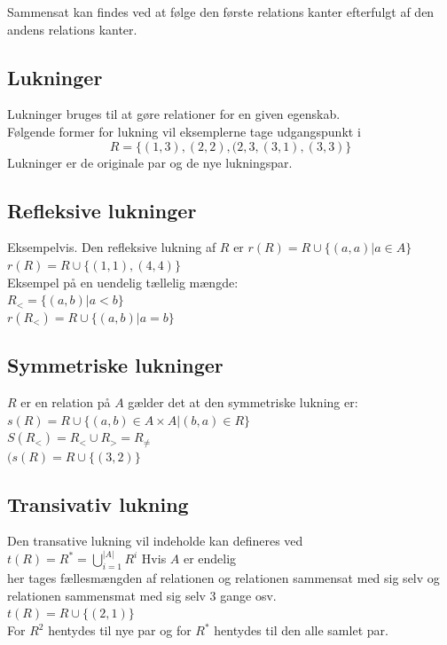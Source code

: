 \documentclass[12pt, a4paper]{article}
\begin{document}
				\begin{center}
					Sammensat kan findes ved at følge den første relations kanter efterfulgt af den andens relations kanter.
				\end{center}
			\subsection{Lukninger }
				Lukninger bruges til at gøre relationer for en given egenskab.\\
				Følgende former for lukning vil eksemplerne tage udgangspunkt i $$R=\{(1,3),(2,2),(2,3,(3,1),(3,3)\}$$
				Lukninger er de originale par og de nye lukningspar.\\
				\subsection{Refleksive lukninger}
					Eksempelvis. Den refleksive lukning af $R$ er $r(R)=R\cup \{(a,a)|a\in A\}$\\
					$r(R)=R\cup \{(1,1),(4,4)\}$\\
					Eksempel på en uendelig tællelig mængde:\\
					$R_<=\{(a,b)|a<b\}$\\
					$r(R_<)=R\cup \{(a,b)|a=b\}$
				\subsection{Symmetriske lukninger}
					$R$ er en relation på $A$ gælder det at den symmetriske lukning er:\\
					$s(R)=R\cup\{(a,b)\in A\times A|(b,a)\in R\}$\\
					$S(R_<)=R_< \cup R_> = R_{\neq}$\\
					$(s(R)=R\cup \{(3,2)\}$
				\subsection{Transivativ lukning}
					Den transative lukning vil indeholde kan defineres ved \\
					$t(R)=R^*=\bigcup\limits_{i=1}^{|A|} R^i$ Hvis $A$ er endelig\\
					her tages fællesmængden af relationen og relationen sammensat med sig selv og relationen sammensmat med sig selv 3 gange osv.\\
					$t(R)=R\cup \{(2,1)\}$\\
					For $R^2$ hentydes til nye par og for $R^*$ hentydes til den alle samlet par.
\end{document}
